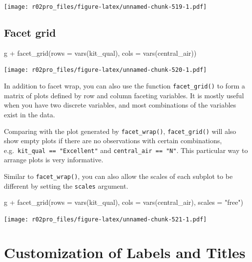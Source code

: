 \documentclass[
]{book}
\newenvironment{Shaded}{\begin{snugshade}}{\end{snugshade}}
\newcommand{\AttributeTok}[1]{\textcolor[rgb]{0.77,0.63,0.00}{#1}}
\newcommand{\FunctionTok}[1]{\textcolor[rgb]{0.00,0.00,0.00}{#1}}
\newcommand{\NormalTok}[1]{#1}
\newcommand{\SpecialCharTok}[1]{\textcolor[rgb]{0.00,0.00,0.00}{#1}}
\newcommand{\StringTok}[1]{\textcolor[rgb]{0.31,0.60,0.02}{#1}}
\begin{document}
\texttt{[image: r02pro\_files/figure-latex/unnamed-chunk-519-1.pdf]}

\hypertarget{facet-grid}{%
\subsection{Facet grid}\label{facet-grid}}

\begin{Shaded}
\begin{Highlighting}[]
\NormalTok{g }\SpecialCharTok{+} \FunctionTok{facet\_grid}\NormalTok{(}\AttributeTok{rows =} \FunctionTok{vars}\NormalTok{(kit\_qual), }\AttributeTok{cols =} \FunctionTok{vars}\NormalTok{(central\_air))}
\end{Highlighting}
\end{Shaded}

\texttt{[image: r02pro\_files/figure-latex/unnamed-chunk-520-1.pdf]}

In addition to facet wrap, you can also use the function \texttt{facet\_grid()} to form a matrix of plots defined by row and column faceting variables. It is mostly useful when you have two discrete variables, and most combinations of the variables exist in the data.

Comparing with the plot generated by \texttt{facet\_wrap()}, \texttt{facet\_grid()} will also show empty plots if there are no observations with certain combinations, e.g.~\texttt{kit\_qual\ ==\ "Excellent"} and \texttt{central\_air\ ==\ "N"}. This particular way to arrange plots is very informative.

Similar to \texttt{facet\_wrap()}, you can also allow the scales of each subplot to be different by setting the \texttt{scales} argument.

\begin{Shaded}
\begin{Highlighting}[]
\NormalTok{g }\SpecialCharTok{+} \FunctionTok{facet\_grid}\NormalTok{(}\AttributeTok{rows =} \FunctionTok{vars}\NormalTok{(kit\_qual), }\AttributeTok{cols =} \FunctionTok{vars}\NormalTok{(central\_air), }\AttributeTok{scales =} \StringTok{"free"}\NormalTok{)}
\end{Highlighting}
\end{Shaded}

\texttt{[image: r02pro\_files/figure-latex/unnamed-chunk-521-1.pdf]}

\hypertarget{customization}{%
\section{Customization of Labels and Titles}\label{customization}}
\end{document}
